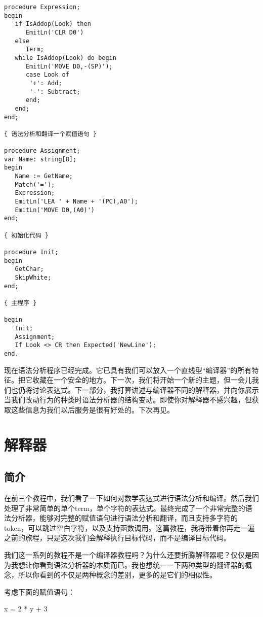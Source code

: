 \begin{verbatim}
procedure Expression;
begin
   if IsAddop(Look) then
      EmitLn('CLR D0')
   else
      Term;
   while IsAddop(Look) do begin
      EmitLn('MOVE D0,-(SP)');
      case Look of
       '+': Add;
       '-': Subtract;
      end;
   end;
end;

{ 语法分析和翻译一个赋值语句 }

procedure Assignment;
var Name: string[8];
begin
   Name := GetName;
   Match('=');
   Expression;
   EmitLn('LEA ' + Name + '(PC),A0');
   EmitLn('MOVE D0,(A0)')
end;

{ 初始化代码 }
                            
procedure Init;
begin
   GetChar;
   SkipWhite;
end;

{ 主程序 }

begin
   Init;
   Assignment;
   If Look <> CR then Expected('NewLine');
end.
\end{verbatim}

现在语法分析程序已经完成。它已具有我们可以放入一个直线型“编译器”的所有特征。把它收藏在一个安全的地方。下一次，我们将开始一个新的主题，但一会儿我们也仍将讨论表达式。下一部分，我打算讲述与编译器不同的解释器，并向你展示当我们改动行为的种类时语法分析器的结构变动。即使你对解释器不感兴趣，但获取这些信息为我们以后服务是很有好处的。下次再见。

\chapter{解释器}

\section{简介}

在前三个教程中，我们看了一下如何对数学表达式进行语法分析和编译。然后我们处理了非常简单的单个term，单个字符的表达式。最终完成了一个非常完整的语法分析器，能够对完整的赋值语句进行语法分析和翻译，而且支持多字符的token，可以跳过空白字符，以及支持函数调用。这篇教程，我将带着你再走一遍之前的旅程，只是这次我们会解释执行目标代码，而不是编译目标代码。

我们这一系列的教程不是一个编译器教程吗？为什么还要折腾解释器呢？仅仅是因为我想让你看到语法分析器的本质而已。我也想统一一下两种类型的翻译器的概念，所以你看到的不仅是两种概念的差别，更多的是它们的相似性。

考虑下面的赋值语句：

\begin{tcolorbox}
x = 2 * y + 3
\end{tcolorbox}

